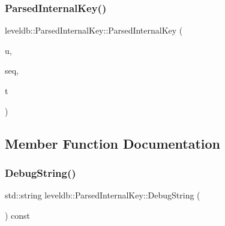 \subsubsection{\texorpdfstring{ParsedInternalKey()}{ParsedInternalKey()}\hspace{0.1cm}{\footnotesize\ttfamily [2/2]}}
{\footnotesize\ttfamily leveldb\+::\+Parsed\+Internal\+Key\+::\+Parsed\+Internal\+Key (\begin{DoxyParamCaption}\item[{const \mbox{\hyperlink{classleveldb_1_1_slice}{Slice}} \&}]{u,  }\item[{const \mbox{\hyperlink{namespaceleveldb_a5481ededd221c36d652c371249f869fa}{Sequence\+Number}} \&}]{seq,  }\item[{\mbox{\hyperlink{namespaceleveldb_acc038cb0d608414730cafa459a4ba866}{Value\+Type}}}]{t }\end{DoxyParamCaption})\hspace{0.3cm}{\ttfamily [inline]}}



\subsection{Member Function Documentation}
\mbox{\label{structleveldb_1_1_parsed_internal_key_a5371a83d503751e8ea7cc23fa16c8bfd}} 
\subsubsection{\texorpdfstring{DebugString()}{DebugString()}}
{\footnotesize\ttfamily std\+::string leveldb\+::\+Parsed\+Internal\+Key\+::\+Debug\+String (\begin{DoxyParamCaption}{ }\end{DoxyParamCaption}) const}

